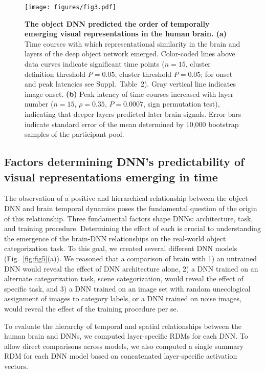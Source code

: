 \documentclass[10pt,twocolumn,letterpaper]{article}
\begin{document}
\begin{figure*}[t]
\begin{center}
   \texttt{[image: figures/fig3.pdf]}
\end{center}
\vspace*{-6mm}
\caption{\textbf{The object DNN predicted the order of temporally emerging visual representations in the human brain. (a)} Time courses with which representational similarity in the brain and layers of the deep object network emerged. Color-coded lines above data curves indicate significant time points ($n = 15$, cluster definition threshold $P = 0.05$, cluster threshold $P = 0.05$; for onset and peak latencies see Suppl.~Table~2). Gray vertical line indicates image onset. \textbf{(b)} Peak latency of time courses increased with layer number ($n = 15$, $\rho = 0.35$, $P = 0.0007$, sign permutation test), indicating that deeper layers predicted later brain signals. Error bars indicate standard error of the mean determined by 10,000 bootstrap samples of the participant pool.}
\label{fig:fig3}
\vspace*{-2mm}
\end{figure*}

\subsection{Factors determining DNN's predictability of visual representations emerging in time}

The observation of a positive and hierarchical relationship between the object DNN and brain temporal dynamics poses the fundamental question of the origin of this relationship. Three fundamental factors shape DNNs: architecture, task, and training procedure. Determining the effect of each is crucial to understanding the emergence of the brain-DNN relationships on the real-world object categorization task. To this goal, we created several different DNN models (Fig.~\ref{fig:fig5}(a)). We reasoned that a comparison of brain with 1) an untrained DNN would reveal the effect of DNN architecture alone, 2) a DNN trained on an alternate categorization task, scene categorization, would reveal the effect of specific task, and 3) a DNN trained on an image set with random unecological assignment of images to category labels, or a DNN trained on noise images, would reveal the effect of the training procedure per se.

To evaluate the hierarchy of temporal and spatial relationships between the human brain and DNNs, we computed layer-specific RDMs for each DNN. To allow direct comparisons across models, we also computed a single summary RDM for each DNN model based on concatenated layer-specific activation vectors.
\end{document}
